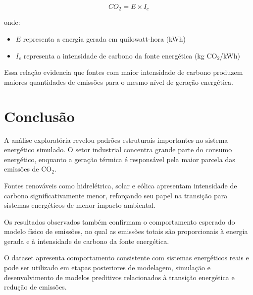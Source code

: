 \documentclass[12pt]{article}
\begin{document}
\[
CO_2 = E \times I_c
\]

onde:

\begin{itemize}
\item $E$ representa a energia gerada em quilowatt-hora (kWh)
\item $I_c$ representa a intensidade de carbono da fonte energética (kg CO$_2$/kWh)
\end{itemize}

Essa relação evidencia que fontes com maior intensidade de carbono produzem maiores quantidades de emissões para o mesmo nível de geração energética.

\section{Conclusão}

A análise exploratória revelou padrões estruturais importantes no sistema energético simulado. O setor industrial concentra grande parte do consumo energético, enquanto a geração térmica é responsável pela maior parcela das emissões de CO$_2$.

Fontes renováveis como hidrelétrica, solar e eólica apresentam intensidade de carbono significativamente menor, reforçando seu papel na transição para sistemas energéticos de menor impacto ambiental.

Os resultados observados também confirmam o comportamento esperado do modelo físico de emissões, no qual as emissões totais são proporcionais à energia gerada e à intensidade de carbono da fonte energética.

O dataset apresenta comportamento consistente com sistemas energéticos reais e pode ser utilizado em etapas posteriores de modelagem, simulação e desenvolvimento de modelos preditivos relacionados à transição energética e redução de emissões.
\end{document}

